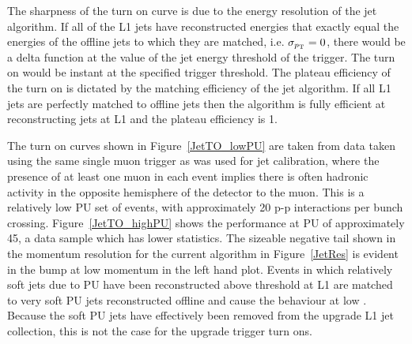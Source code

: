 The sharpness of the turn on curve is due to the energy resolution of the jet algorithm.
If all of the \ac{L1} jets have reconstructed energies that exactly equal the energies of the offline jets to which they are matched,
i.e. $\sigma_{p_{\text{T}}} = 0$, there would be a delta function at the value of the jet energy threshold of the trigger.
The turn on would be instant at the specified trigger threshold.
%
The plateau efficiency of the turn on is dictated by the matching efficiency of the jet algorithm.
If all \ac{L1} jets are perfectly matched to offline jets then the algorithm is fully efficient at reconstructing jets at \ac{L1} and the plateau efficiency is 1.

The turn on curves shown in Figure~\ref{JetTO_lowPU} are taken from data taken using the same single muon trigger as was used for jet calibration, where the presence of at least one muon in each event implies there is often hadronic activity in the opposite hemisphere of the detector to the muon. 
This is a relatively low \ac{PU} set of events, with approximately 20 p-p interactions per bunch crossing. 
Figure~\ref{JetTO_highPU} shows the performance at \ac{PU} of approximately 45, a data sample which has lower statistics.
The sizeable negative tail shown in the momentum resolution for the current algorithm in Figure~\ref{JetRes} is 
evident in the bump at low momentum in the left hand plot.
Events in which relatively soft jets due to \ac{PU} have been reconstructed above threshold at \ac{L1} are 
matched to very soft \ac{PU} jets reconstructed offline and cause the behaviour at low \pt.
Because the soft \ac{PU} jets have effectively been removed from the upgrade \ac{L1} jet collection, this is not the case for the upgrade trigger turn ons.


